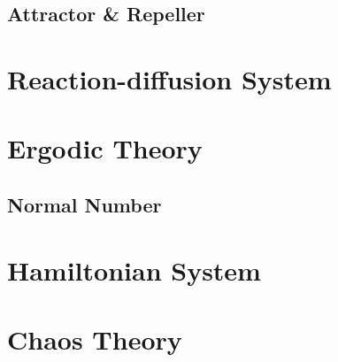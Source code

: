 \subsection{Attractor \& Repeller}\label{sec:attractor_repeller}



\section{Reaction-diffusion System}\label{sec:reaction_diffusion}

\section{Ergodic Theory}\label{sec:ergodic_theory}

\subsection{Normal Number}\label{sec:normal_number}



\section{Hamiltonian System}\label{sec:hamiltonian_system}

\section{Chaos Theory}\label{sec:chaos_theory}
